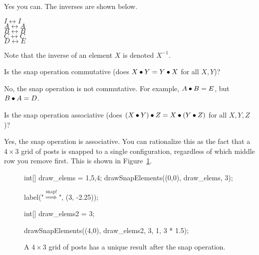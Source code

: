 \documentclass[../gatm_answers.tex]{subfiles}
\begin{document}
\noindent Yes you can. The inverses are shown below.
\begin{multicols}{5}
\centering
$I\leftrightarrow I$\\
$A\leftrightarrow A$\\
$B\leftrightarrow B$\\
$C\leftrightarrow C$\\
$D\leftrightarrow E$
\end{multicols}

\noindent Note that the inverse of an element $X$ is denoted $X^{-1}$.

\begin{outer_problem}
\item

\begin{inner_problem}[start=1,leftmargin=25pt]
\item Is the snap operation commutative (does $X \bullet Y = Y \bullet X$ for all $X,Y$)?
\end{inner_problem}
\end{outer_problem}

\noindent No, the snap operation is not commutative. For example, $A\bullet B=E$, but $B\bullet A = D$.

\begin{inner_problem}
\item Is the snap operation associative (does $(X \bullet Y) \bullet Z = X \bullet (Y\bullet Z)$ for all $X,Y,Z$)?
\end{inner_problem}

\noindent Yes, the snap operation is associative. You can rationalize this as the fact that a $4\times 3$ grid of posts is snapped to a single configuration, regardless of which middle row you remove first. This is shown in Figure~\ref{fig:four_by_three}.

\begin{figure}[h]
	\begin{center}
		\begin{minipage}[b]{\textwidth}
			\centering
			\begin{asy}[width=0.2\textwidth]
				int[] draw_elems = {1,5,4};
				drawSnapElements((0,0), draw_elems, 3);
				
				label("$\stackrel{\text{snap!}}{\Longrightarrow}$", (3, -2.25));
				
				int[] draw_elems2 = {3};
				
				drawSnapElements((4,0), draw_elems2, 3, 1, 3 * 1.5);
			\end{asy}
		\end{minipage}
	\end{center}
	\vspace*{-2\baselineskip}
	\begin{center}
		\begin{minipage}[t]{\textwidth}
			\caption{A $4\times 3$ grid of posts has a unique result after the snap operation.}
			\label{fig:four_by_three}
		\end{minipage}
	\end{center}
	\vspace*{-2\baselineskip}
\end{figure}
\end{document}
